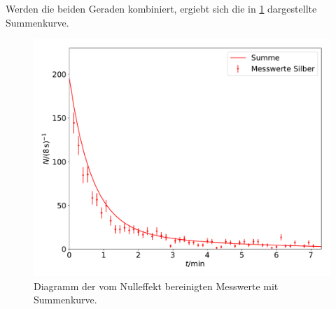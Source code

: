 Werden die beiden Geraden kombiniert, ergiebt sich die in \ref{fig:7} dargestellte
Summenkurve.
\begin{figure}
\centering
  \includegraphics[width=\textwidth]{2Silber.pdf}
  \caption{Diagramm der vom Nulleffekt bereinigten Messwerte mit Summenkurve.}
  \label{fig:7}
\end{figure}
